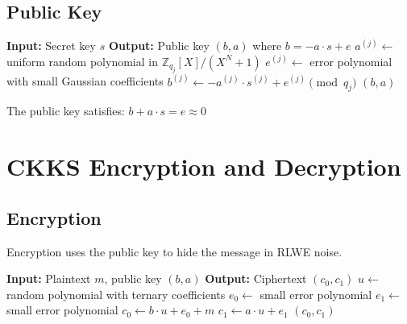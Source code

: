 \documentclass[11pt,a4paper]{article}
\newcommand{\Z}{\mathbb{Z}}
\begin{document}
\subsection{Public Key}

\begin{algorithm}[H]
\caption{Public Key Generation}
\begin{algorithmic}[1]
    \State \textbf{Input:} Secret key $s$
    \State \textbf{Output:} Public key $(b, a)$ where $b = -a \cdot s + e$
    \State
        \State $a^{(j)} \gets$ uniform random polynomial in $\Z_{q_j}[X]/(X^N+1)$
        \State $e^{(j)} \gets$ error polynomial with small Gaussian coefficients
        \State $b^{(j)} \gets -a^{(j)} \cdot s^{(j)} + e^{(j)} \pmod{q_j}$
    \EndFor
    \State \Return $(b, a)$
\EndFunction
\end{algorithmic}
\end{algorithm}

The public key satisfies: $b + a \cdot s = e \approx 0$

\section{CKKS Encryption and Decryption}

\subsection{Encryption}

Encryption uses the public key to hide the message in RLWE noise.

\begin{algorithm}[H]
\caption{CKKS Encryption}
\begin{algorithmic}[1]
    \State \textbf{Input:} Plaintext $m$, public key $(b, a)$
    \State \textbf{Output:} Ciphertext $(c_0, c_1)$
    \State
    \State $u \gets$ random polynomial with ternary coefficients
    \State $e_0 \gets$ small error polynomial
    \State $e_1 \gets$ small error polynomial
    \State
    \State $c_0 \gets b \cdot u + e_0 + m$
    \State $c_1 \gets a \cdot u + e_1$
    \State
    \State \Return $(c_0, c_1)$
\EndFunction
\end{algorithmic}
\end{algorithm}
\end{document}
